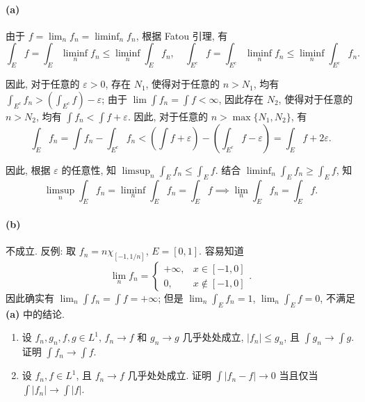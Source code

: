 \documentclass{article}
\begin{document}
\begin{solution}
	\paragraph{(a)} 由于 $f = \lim_n f_n = \liminf_n f_n$, 根据 Fatou 引理, 有
	\[ \int_E f = \int_E \liminf_n f_n \le \liminf_n \int_E f_n, \quad
	\int_{E^c} f = \int_{E^c} \liminf_n f_n \le \liminf_n \int_{E^c} f_n. \]

	因此, 对于任意的 $\varepsilon>0$, 存在 $N_1$, 使得对于任意的 $n>N_1$, 均有 $\int_{E^c} f_n > (\int_{E^c} f) - \varepsilon$; 由于 $\lim \int f_n = \int f < \infty$, 因此存在 $N_2$, 使得对于任意的 $n > N_2$, 均有 $\int f_n < \int f + \varepsilon$. 因此, 对于任意的 $n > \max\{N_1, N_2\}$, 有
	\[ \int_{E} f_n = \int f_n - \int_{E^c} f_n < \left( \int f + \varepsilon \right) - \left( \int_{E^c} f - \varepsilon \right) = \int_E f + 2 \varepsilon. \]

	因此, 根据 $\varepsilon$ 的任意性, 知 $\limsup_n \int_E f_n \le \int_E f$. 结合 $\liminf_n \int_E f_n \ge \int_E f$, 知
	\[ \limsup_n \int_E f_n = \liminf_n \int_E f_n = \int_E f
	\implies \lim_n \int_E f_n = \int_E f. \]

	\paragraph{(b)} 不成立. 反例: 取 $f_n = n \chi_{[-1, 1/n]}$, $E = [0,1]$. 容易知道
	\[ \lim_n f_n = \begin{cases}
		+\infty, & x \in [-1, 0] \\ 0, & x \notin [-1, 0]
	\end{cases}. \]
	因此确实有 $\lim_n \int f_n = \int f = +\infty$; 但是 $\lim_n \int_{E} f_n = 1$, $\lim_n \int_E f = 0$, 不满足 \textbf{(a)} 中的结论.
\end{solution}



\begin{problem}
  \begin{enumerate}
    \item[(a)] 设 $f_n,g_n,f,g\in L^1$, $f_n\to f$ 和 $g_n\to g$ 几乎处处成立, $|f_n|\leq g_n$, 且 $\int g_n\to\int g$. 证明 $\int f_n\to\int f$.
    \item[(b)] 设 $f_n,f\in L^1$, 且 $f_n\to f$ 几乎处处成立. 证明 $\int|f_n-f|\to0$ 当且仅当 $\int|f_n|\to\int|f|$.
  \end{enumerate}
\end{problem}
\end{document}
